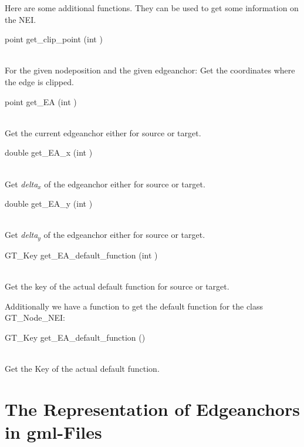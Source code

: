 \documentclass[twoside,fleqn]{report}
\begin{document}
Here are some additional functions. 
They can be used to get some information on the NEI.


\begin{Cdefinition}

  \item[point get\_clip\_point (int \Param{where})] \strut\\
    For the given nodeposition and the given edgeanchor: Get the 
    coordinates where the edge is clipped.

  \item[point get\_EA (int \Param{where})] \strut\\
    Get the current edgeanchor either for source or target. 

  \item[double get\_EA\_x (int \Param{where})] \strut\\
    Get \emph{delta$_x$} of the edgeanchor either for source or target.

  \item[double get\_EA\_y (int \Param{where})] \strut\\
    Get \emph{delta$_y$} of the edgeanchor either for source or target.

  \item[GT\_Key get\_EA\_default\_function (int \Param{where})] \strut\\
    Get the key of the actual default function for source or target.

\end{Cdefinition}

Additionally we have a function to get the default function for the class
GT\_Node\_NEI:

\begin{Cdefinition}
  \item[GT\_Key get\_EA\_default\_function ()] \strut\\
    Get the Key of the actual default function.
\end{Cdefinition}

\section{The Representation of Edgeanchors in gml-Files}
\end{document}
